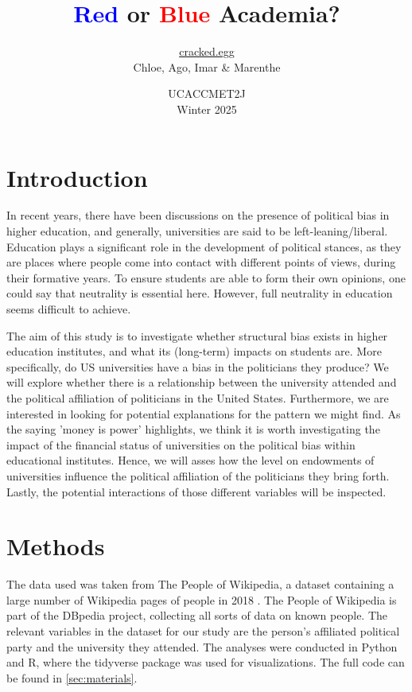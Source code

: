 \documentclass{article}
\title{\textcolor{blue}{Red} or \textcolor{red}{Blue} Academia?}
\author{\underline{cracked.egg}\\Chloe, Ago, Imar \& Marenthe}
\date{UCACCMET2J\\Winter 2025}
\begin{document}
\maketitle

\section{Introduction}
In recent years, there have been discussions on the presence of political bias in higher education, and generally, universities are said to be left-leaning/liberal. Education plays a significant role in the development of political stances, as they are places where people come into contact with different points of views, during their formative years. To ensure students are able to form their own opinions, one could say that neutrality is essential here. However, full neutrality in education seems difficult to achieve. 

The aim of this study is to investigate whether structural bias exists in higher education institutes, and what its (long-term) impacts on students are. More specifically, do US universities have a bias in the politicians they produce? We will explore whether there is a relationship between the university attended and the political affiliation of politicians in the United States. Furthermore, we are interested in looking for potential explanations for the pattern we might find. As the saying 'money is power' highlights, we think it is worth investigating the impact of the financial status of universities on the political bias within educational institutes. Hence, we will asses how the level on endowments of universities influence the political affiliation of the politicians they bring forth. Lastly, the potential interactions of those different variables will be inspected. 
 
\section{Methods}

The data used was taken from The People of Wikipedia, a dataset containing a large number of Wikipedia pages of people in 2018 \cite{lehmann2015dbpedia}. The People of Wikipedia is part of the DBpedia project, collecting all sorts of data on known people. The relevant variables in the dataset for our study are the person's affiliated political party and the university they attended. The analyses were conducted in Python and R, where the tidyverse package was used for visualizations. The full code can be found in \autoref{sec:materials}.
\end{document}

